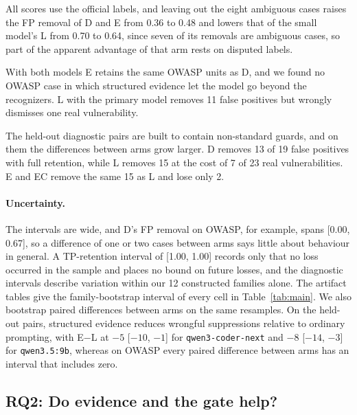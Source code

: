 All scores use the official labels, and leaving out the eight ambiguous cases raises the FP removal of D and E from 0.36 to 0.48 and lowers that of the small model's L from 0.70 to 0.64, since seven of its removals are ambiguous cases, so part of the apparent advantage of that arm rests on disputed labels.

With both models E retains the same OWASP units as D, and we found no OWASP case in which structured evidence let the model go beyond the recognizers. L with the primary model removes 11 false positives but wrongly dismisses one real vulnerability.

The held-out diagnostic pairs are built to contain non-standard guards, and on them the differences between arms grow larger. D removes 13 of 19 false positives with full retention, while L removes 15 at the cost of 7 of 23 real vulnerabilities. E and EC remove the same 15 as L and lose only 2.

\paragraph{Uncertainty.}
The intervals are wide, and D's FP removal on OWASP, for example, spans [0.00, 0.67], so a difference of one or two cases between arms says little about behaviour in general. A TP-retention interval of [1.00, 1.00] records only that no loss occurred in the sample and places no bound on future losses, and the diagnostic intervals describe variation within our 12 constructed families alone. The artifact tables give the family-bootstrap interval of every cell in Table~\ref{tab:main}. We also bootstrap paired differences between arms on the same resamples. On the held-out pairs, structured evidence reduces wrongful suppressions relative to ordinary prompting, with E$-$L at $-5$ [$-10$, $-1$] for \texttt{qwen3-coder-next} and $-8$ [$-14$, $-3$] for \texttt{qwen3.5:9b}, whereas on OWASP every paired difference between arms has an interval that includes zero.

\begin{table}[t]
\caption{Held-out results at unit level.}
\label{tab:main}
\small
\end{table}

\subsection{RQ2: Do evidence and the gate help?}

